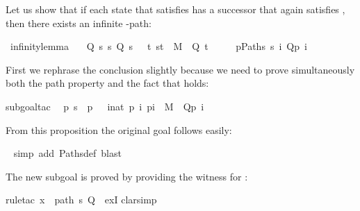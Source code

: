 \begin{isabellebody}
\begin{isamarkuptext}
Let us show that if each state  that satisfies 
has a successor that again satisfies , then there exists an infinite -path:%
\end{isamarkuptext}%
\isamarkuptrue%
\isamarkupfalse%
\ infinity{\isacharunderscore}lemma{\isacharcolon}\isanewline
\ \ {\isachardoublequoteopen}{\isasymlbrakk}\ Q\ s{\isacharsemicolon}\ {\isasymforall}s{\isachardot}\ Q\ s\ {\isasymlongrightarrow}\ {\isacharparenleft}{\isasymexists}\ t{\isachardot}\ {\isacharparenleft}s{\isacharcomma}t{\isacharparenright}\ {\isasymin}\ M\ {\isasymand}\ Q\ t{\isacharparenright}\ {\isasymrbrakk}\ {\isasymLongrightarrow}\isanewline
\ \ \ {\isasymexists}p{\isasymin}Paths\ s{\isachardot}\ {\isasymforall}i{\isachardot}\ Q{\isacharparenleft}p\ i{\isacharparenright}{\isachardoublequoteclose}%
\isadelimproof
%
\endisadelimproof
%
\isatagproof
%
\begin{isamarkuptxt}%
\noindent
First we rephrase the conclusion slightly because we need to prove simultaneously
both the path property and the fact that  holds:%
\end{isamarkuptxt}%
\isamarkuptrue%
\isamarkupfalse%
{\isacharparenleft}subgoal{\isacharunderscore}tac\isanewline
\ \ {\isachardoublequoteopen}{\isasymexists}p{\isachardot}\ s\ {\isacharequal}\ p\ {}\ {\isasymand}\ {\isacharparenleft}{\isasymforall}i{\isacharcolon}{\isacharcolon}nat{\isachardot}\ {\isacharparenleft}p\ i{\isacharcomma}\ p{\isacharparenleft}i{\isacharplus}{}{\isacharparenright}{\isacharparenright}\ {\isasymin}\ M\ {\isasymand}\ Q{\isacharparenleft}p\ i{\isacharparenright}{\isacharparenright}{\isachardoublequoteclose}{\isacharparenright}%
\begin{isamarkuptxt}%
\noindent
From this proposition the original goal follows easily:%
\end{isamarkuptxt}%
\isamarkuptrue%
\ \isamarkupfalse%
{\isacharparenleft}simp\ add{\isacharcolon}\ Paths{\isacharunderscore}def{\isacharcomma}\ blast{\isacharparenright}%
\begin{isamarkuptxt}%
\noindent
The new subgoal is proved by providing the witness  for :%
\end{isamarkuptxt}%
\isamarkuptrue%
\isamarkupfalse%
{\isacharparenleft}rule{\isacharunderscore}tac\ x\ {\isacharequal}\ {\isachardoublequoteopen}path\ s\ Q{\isachardoublequoteclose}\ \ exI{\isacharparenright}\isanewline
{}\isamarkupfalse%
{\isacharparenleft}clarsimp{\isacharparenright}%

\end{isabellebody}
